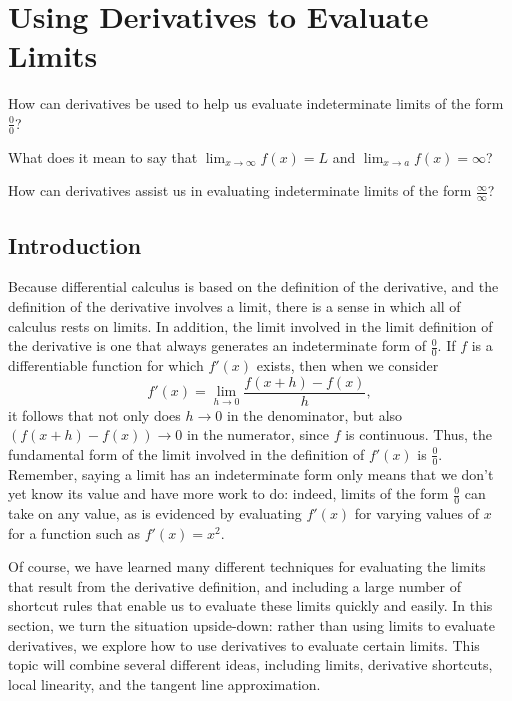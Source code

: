 \section{Using Derivatives to Evaluate Limits} \label{S:3.7.LHR}

\begin{goals}
\item How can derivatives be used to help us evaluate indeterminate limits of the form $\frac{0}{0}$?
\item What does it mean to say that $\lim_{x \to \infty} f(x) = L$ and $\lim_{x \to a} f(x) = \infty$?
\item How can derivatives assist us in evaluating indeterminate limits of the form $\frac{\infty}{\infty}$?
\end{goals}

\subsection*{Introduction}

Because differential calculus is based on the definition of the derivative, and the definition of the derivative involves a limit, there is a sense in which all of calculus rests on limits.  In addition, the limit involved in the limit definition of the derivative is one that always generates an indeterminate form of $\frac{0}{0}$.  If $f$ is a differentiable function for which $f'(x)$ exists, then when we consider
$$f'(x) = \lim_{h \to 0} \frac{f(x+h)-f(x)}{h},$$
it follows that not only does $h \to 0$ in the denominator, but also $(f(x+h)-f(x)) \to 0$ in the numerator, since $f$ is continuous.   Thus, the fundamental form of the limit involved in the definition of $f'(x)$ is $\frac{0}{0}$.  Remember, saying a limit has an indeterminate form only means that we don't yet know its value and have more work to do:  indeed, limits of the form $\frac{0}{0}$ can take on any value, as is evidenced by evaluating $f'(x)$ for varying values of $x$ for a function such as $f'(x) = x^2$.

Of course, we have learned many different techniques for evaluating the limits that result from the derivative definition, and including a large number of shortcut rules that enable us to evaluate these limits quickly and easily.  In this section, we turn the situation upside-down:  rather than using limits to evaluate derivatives, we explore how to use derivatives to evaluate certain limits.  This topic will combine several different ideas, including limits, derivative shortcuts, local linearity, and the tangent line approximation.

